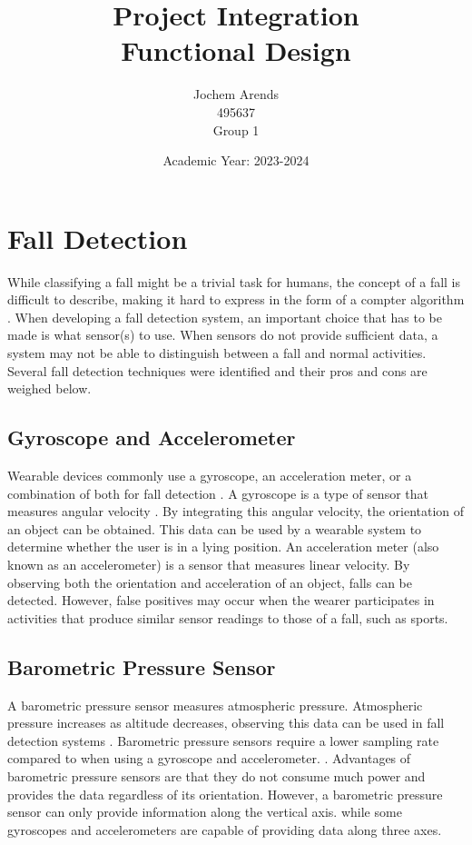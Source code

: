 \documentclass{article}
\title{Project Integration \\ Functional Design}
\author{Jochem Arends \\ 495637 \\ Group 1}
\date{Academic Year: 2023-2024}
\begin{document}
\maketitle
\newpage

\tableofcontents
\clearpage

\section{Fall Detection}

While classifying a fall might be a trivial task for humans, the concept of a fall is difficult to describe, making it hard to express in the form of a compter algorithm \cite{noury-2007}.
When developing a fall detection system, an important choice that has to be made is what sensor(s) to use.
When sensors do not provide sufficient data, a system may not be able to distinguish between a fall and normal activities.
Several fall detection techniques were identified and their pros and cons are weighed below.

\subsection{Gyroscope and Accelerometer}

Wearable devices commonly use a gyroscope, an acceleration meter, or a combination of both for fall detection \cite{delahoz-2014}.
A gyroscope is a type of sensor that measures angular velocity \cite{passaro-2017}.
By integrating this angular velocity, the orientation of an object can be obtained.
This data can be used by a wearable system to determine whether the user is in a lying position.
An acceleration meter (also known as an accelerometer) is a sensor that measures linear velocity.
By observing both the orientation and acceleration of an object, falls can be detected.
However, false positives may occur when the wearer participates in activities that produce similar sensor readings to those of a fall, such as sports.

\subsection{Barometric Pressure Sensor}

A barometric pressure sensor measures atmospheric pressure.
Atmospheric pressure increases as altitude decreases, observing this data can be used in fall detection systems \cite{sun-2019}.
Barometric pressure sensors require a lower sampling rate compared to when using a gyroscope and accelerometer. \cite{sun-2019}.
Advantages of barometric pressure sensors are that they do not consume much power and provides the data regardless of its orientation.
However, a barometric pressure sensor can only provide information along the vertical axis. while some gyroscopes and accelerometers are capable of providing data along three axes.
\end{document}
